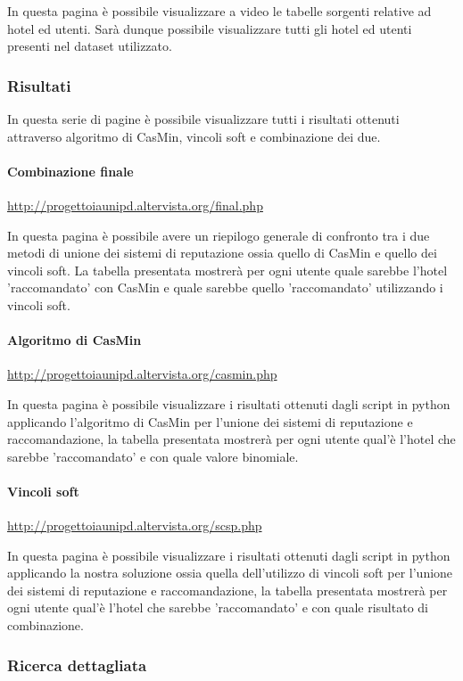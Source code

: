 \documentclass{report}
\newcommand{\myparagraph}[1]{\paragraph{#1}\mbox{} \mbox{}}
\begin{document}
	In questa pagina è possibile visualizzare a video le tabelle sorgenti relative ad hotel ed utenti.
	Sarà dunque possibile visualizzare tutti gli hotel ed utenti presenti nel dataset utilizzato.
	
	\subsubsection{Risultati}
	
	In questa serie di pagine è possibile visualizzare tutti i risultati ottenuti attraverso algoritmo di CasMin, vincoli soft e combinazione dei due.
	
	\myparagraph{Combinazione finale}
	
	\url{http://progettoiaunipd.altervista.org/final.php}
	\newline
	
	In questa pagina è possibile avere un riepilogo generale di confronto tra i due metodi di unione dei sistemi di reputazione ossia quello di CasMin e quello dei vincoli soft. La tabella presentata mostrerà per ogni utente quale sarebbe l'hotel 'raccomandato' con CasMin e quale sarebbe quello 'raccomandato' utilizzando i vincoli soft.
	
	\myparagraph{Algoritmo di CasMin}
	
	\url{http://progettoiaunipd.altervista.org/casmin.php}
	\newline
	
	In questa pagina è possibile visualizzare i risultati ottenuti dagli script in python applicando l'algoritmo di CasMin per l'unione dei sistemi di reputazione e raccomandazione, la tabella presentata mostrerà per ogni utente qual'è l'hotel che sarebbe 'raccomandato' e con quale valore binomiale.
	
	\myparagraph{Vincoli soft}
	
	\url{http://progettoiaunipd.altervista.org/scsp.php}
	\newline
	
	In questa pagina è possibile visualizzare i risultati ottenuti dagli script in python applicando la nostra soluzione ossia quella dell'utilizzo di vincoli soft per l'unione dei sistemi di reputazione e raccomandazione, la tabella presentata mostrerà per ogni utente qual'è l'hotel che sarebbe 'raccomandato' e con quale risultato di combinazione.
	
	\subsubsection{Ricerca dettagliata}
	
\end{document}
